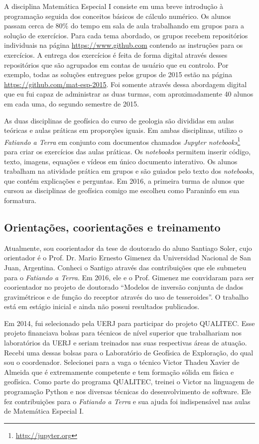 \documentclass[12pt,a4paper,oneside,titlepage,onecolumn]{article}
\begin{document}
A disciplina Matemática Especial I consiste em uma breve introdução à
programação seguida dos conceitos básicos de cálculo numérico.
Os alunos passam cerca de $80\%$ do tempo em sala de aula trabalhando em grupos
para a solução de exercícios.
Para cada tema abordado, os grupos recebem repositórios individuais na página
\url{https://www.github.com} contendo as instruções para os exercícios.
A entrega dos exercícios é feita de forma digital através desses repositórios
que são agrupados em contas de usuário que eu controlo.
Por exemplo, todas as soluções entregues pelos grupos de 2015 estão na página
\url{https://github.com/mat-esp-2015}.
Foi somente através dessa abordagem digital que eu fui capaz de administrar as
duas turmas, com aproximadamente 40 alunos em cada uma, do segundo semestre de
2015.


As duas disciplinas de geofísica do curso de geologia são divididas em aulas
teóricas e aulas práticas em proporções iguais.
Em ambas disciplinas, utilizo o \textit{Fatiando a Terra} em conjunto com
documentos chamados \textit{Jupyter
notebooks}\footnote{\url{http://jupyter.org}} para criar os exercícios das
aulas práticas.
Os \textit{notebooks} permitem inserir código, texto, imagens, equações e
vídeos em único documento interativo.
Os alunos trabalham na atividade prática em grupos e são guiados pelo texto dos
\textit{notebooks}, que contém explicações e perguntas.
Em 2016, a primeira turma de alunos que cursou as disciplinas de geofísica
comigo me escolheu como Paraninfo em sua formatura.



\subsection{Orientações, coorientações e treinamento}

Atualmente, sou coorientador da tese de doutorado do aluno Santiago Soler, cujo
orientador é o Prof. Dr. Mario Ernesto Gimenez da Universidad Nacional de San
Juan, Argentina.
Conheci o Santigo através das contribuições que ele submeteu para o
\textit{Fatiando a Terra}.
Em 2016, ele e o Prof. Gimenez me convidaram para ser coorientador no projeto
de doutorado ``Modelos de inversão conjunta de dados gravimétricos e de função
do receptor através do uso de tesseroides''.
O trabalho está em estágio inicial e ainda não possui resultados publicados.

Em 2014, fui selecionado pela UERJ para participar do projeto QUALITEC.
Esse projeto financiava bolsas para técnicos de nível superior que trabalhariam
nos laboratórios da UERJ e seriam treinados nas suas respectivas áreas de
atuação.
Recebi uma dessas bolsas para o Laboratório de Geofísica de Exploração, do qual
sou o coordenador.
Selecionei para a vaga o técnico Victor Thadeu Xavier de Almeida que é
extremamente competente e tem formação sólida em física e geofísica.
Como parte do programa QUALITEC, treinei o Victor na linguagem de programação
Python e nos diversas técnicas do desenvolvimento de software.
Ele fez contribuições para o \textit{Fatiando a Terra} e sua ajuda foi
indispensável nas aulas de Matemática Especial I.
\end{document}
